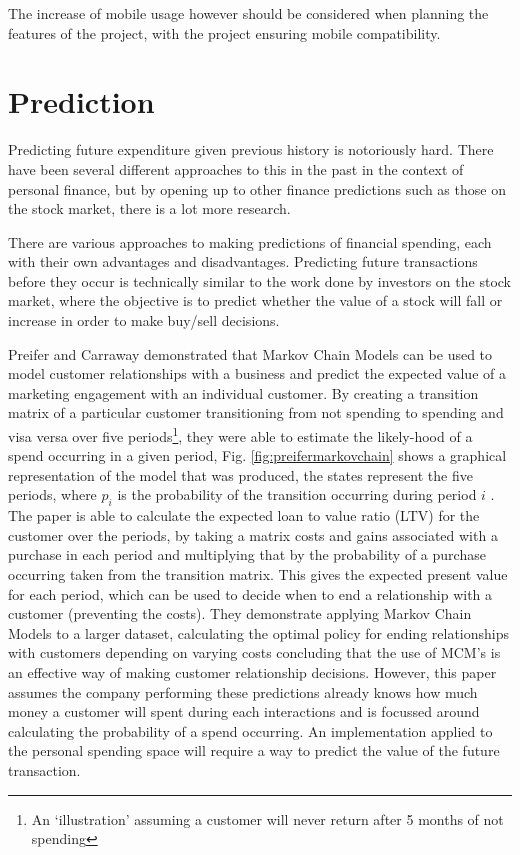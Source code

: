 The increase of mobile usage however should be considered when planning the features of the project, with the project ensuring mobile compatibility.

\section{Prediction}

Predicting future expenditure given previous history is notoriously hard. There have been several different approaches to this in the past in the context of personal finance, but by opening up to other finance predictions such as those on the stock market, there is a lot more research.


There are various approaches to making predictions of financial spending, each with their own advantages and disadvantages. Predicting future transactions before they occur is technically similar to the work done by investors on the stock market, where the objective is to predict whether the value of a stock will fall or increase in order to make buy/sell decisions.



Preifer and Carraway demonstrated that Markov Chain Models can be used to model customer relationships with a business and predict the expected value of a marketing engagement with an individual customer. By creating a transition matrix of a particular customer transitioning from not spending to spending and visa versa over five periods\footnote{An `illustration' assuming a customer will never return after 5 months of not spending}, they were able to estimate the likely-hood of a spend occurring in a given period, Fig. \ref{fig:preifermarkovchain} shows a graphical representation of the model that was produced, the states represent the five periods, where $p_{i}$ is the probability of the transition occurring during period $i$ \cite{pfeifer2000modeling}.
% 
The paper is able to calculate the expected loan to value ratio (LTV) for the customer over the periods, by taking a matrix costs and gains associated with a purchase in each period and multiplying that by the probability of a purchase occurring taken from the transition matrix. This gives the expected present value for each period, which can be used to decide when to end a relationship with a customer (preventing the costs).
%
They demonstrate applying Markov Chain Models to a larger dataset, calculating the optimal policy for ending relationships with customers depending on varying costs concluding that the use of MCM's is an effective way of making customer relationship decisions. However, this paper assumes the company performing these predictions already knows how much money a customer will spent during each interactions and is focussed around calculating the probability of a spend occurring. An implementation applied to the personal spending space will require a way to predict the value of the future transaction.

